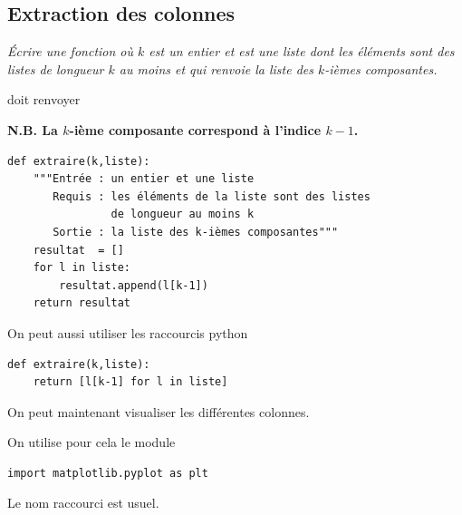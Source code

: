 \subsection{Extraction des colonnes}
\begin{Exercise}\it Écrire une fonction  où $k$ est un entier et  est une liste dont les éléments sont des listes de longueur $k$ au moins et qui renvoie la liste des $k$-ièmes composantes.

 doit renvoyer \type{[2, 5]}
\end{Exercise}
{\bf N.B. La $k$-ième composante correspond à l'indice $k-1$.}
\begin{Answer}
\begin{lstlisting}
def extraire(k,liste):
    """Entrée : un entier et une liste
       Requis : les éléments de la liste sont des listes 
                de longueur au moins k
       Sortie : la liste des k-ièmes composantes"""
    resultat  = []
    for l in liste:
        resultat.append(l[k-1])
    return resultat
\end{lstlisting}
On peut aussi utiliser les raccourcis python
\begin{lstlisting}
def extraire(k,liste):
    return [l[k-1] for l in liste]
\end{lstlisting}
\end{Answer}
\medskip

On peut maintenant visualiser les différentes colonnes.

On utilise pour cela le module 
\begin{lstlisting}
import matplotlib.pyplot as plt 
\end{lstlisting}
Le nom raccourci  est usuel.

